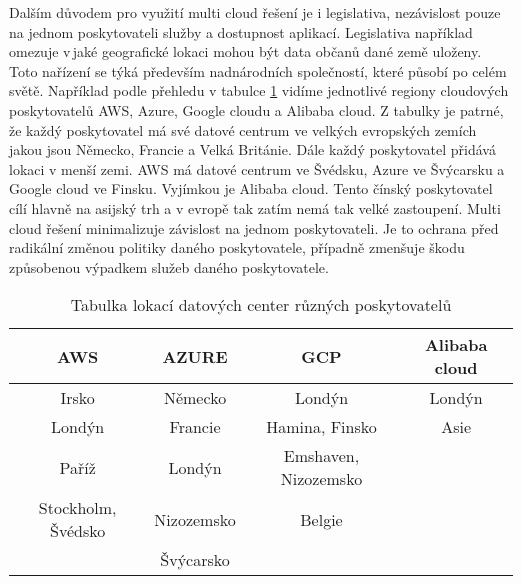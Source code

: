 	Dalším důvodem pro využití multi cloud řešení je i legislativa, nezávislost pouze na jednom poskytovateli služby a dostupnost aplikací. Legislativa například omezuje \linebreak v\,jaké geografické lokaci mohou být data občanů dané země uloženy. Toto nařízení se týká především nadnárodních společností, které působí po celém světě. Například podle přehledu v tabulce \ref{table:1} vidíme jednotlivé regiony cloudových poskytovatelů AWS, Azure, Google cloudu a Alibaba cloud. Z tabulky je patrné, že každý poskytovatel má své datové centrum ve velkých evropských zemích jakou jsou Německo, Francie a Velká Británie. Dále každý poskytovatel přidává lokaci v menší zemi. AWS má datové centrum ve Švédsku, Azure ve Švýcarsku a Google cloud ve Finsku. Vyjímkou je Alibaba cloud. Tento čínský poskytovatel cílí hlavně na asijský trh a v evropě tak zatím nemá tak velké zastoupení. Multi cloud řešení minimalizuje závislost na jednom poskytovateli. Je to ochrana před radikální změnou politiky daného poskytovatele, případně zmenšuje škodu způsobenou výpadkem služeb daného poskytovatele.

\begin{table}[h]
\begin{tabular}{c|c|c|c}
\hline
	\textbf{AWS}    & \textbf{AZURE}   & \textbf{GCP}    & \textbf{Alibaba cloud}  \\ \hline
	Irsko  & Německo & Londýn               & Londýn         \\ \hline
	Londýn & Francie & Hamina, Finsko       & Asie           \\ \hline
	Paříž  & Londýn  & Emshaven, Nizozemsko &                \\ \hline
	Stockholm, Švédsko & Nizozemsko & Belgie &               \\ \hline
	       & Švýcarsko &            &       &               
\end{tabular}
\caption{Tabulka lokací datových center různých poskytovatelů}
\label{table:1}
\end{table}
